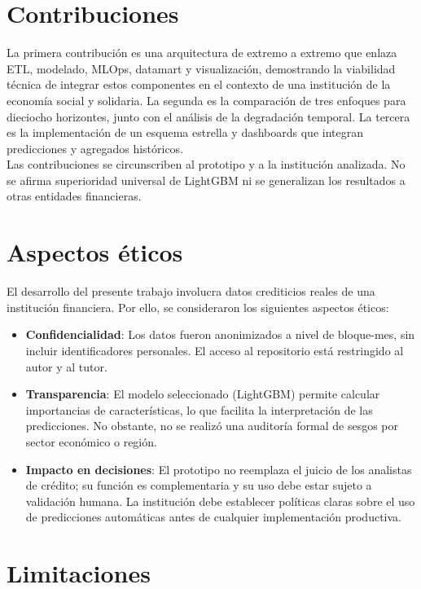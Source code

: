 \section{Contribuciones}

La primera contribución es una arquitectura de extremo a extremo que enlaza ETL, modelado, MLOps, datamart y visualización, demostrando la viabilidad técnica de integrar estos componentes en el contexto de una institución de la economía social y solidaria. La segunda es la comparación de tres enfoques para dieciocho horizontes, junto con el análisis de la degradación temporal. La tercera es la implementación de un esquema estrella y dashboards que integran predicciones y agregados históricos.\\

Las contribuciones se circunscriben al prototipo y a la institución analizada. No se afirma superioridad universal de LightGBM ni se generalizan los resultados a otras entidades financieras.

\section{Aspectos éticos}

El desarrollo del presente trabajo involucra datos crediticios reales de una institución financiera. Por ello, se consideraron los siguientes aspectos éticos:

\begin{itemize}
    \item \textbf{Confidencialidad}: Los datos fueron anonimizados a nivel de bloque-mes, sin incluir identificadores personales. El acceso al repositorio está restringido al autor y al tutor.
    \item \textbf{Transparencia}: El modelo seleccionado (LightGBM) permite calcular importancias de características, lo que facilita la interpretación de las predicciones. No obstante, no se realizó una auditoría formal de sesgos por sector económico o región.
    \item \textbf{Impacto en decisiones}: El prototipo no reemplaza el juicio de los analistas de crédito; su función es complementaria y su uso debe estar sujeto a validación humana. La institución debe establecer políticas claras sobre el uso de predicciones automáticas antes de cualquier implementación productiva.
\end{itemize}

\section{Limitaciones}

